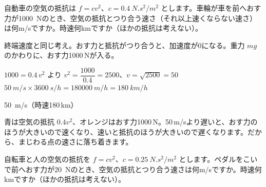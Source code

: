 \begin{reidai}[力のつり合いで決まる最高速度]
自動車の空気の抵抗は $f=cv^2$、$c=\qty{0.4}{N.s^2/m^2}$ とします。車輪が車を前へおす力が\qty{1000}{N}のとき、空気の抵抗とつり合う速さ（それ以上速くならない速さ）は何m/sですか。時速何kmですか（ほかの抵抗は考えない）。\par
\kangaekata 終端速度と同じ考え。おす力と抵抗がつり合うと、加速度が0になる。重力 $mg$ のかわりに、おす力1000\,Nが入る。\par
\shiki $1000=0.4\,v^2$ より $v^2=\dfrac{1000}{0.4}=2500$、$v=\sqrt{2500}=50$\bkvifq
$\qty{50}{m/s}\times\qty{3600}{s/h}=\qty{180000}{m/h}=\qty{180}{km/h}$\par
\kotae \qty{50}{m/s}（時速180\,km）
\end{reidai}
\noindent\begin{minipage}[c]{0.5\linewidth}
\end{minipage}\hfill
\begin{minipage}[c]{0.46\linewidth}\raggedright
青は空気の抵抗 $0.4v^2$、オレンジはおす力1000\,N。50\,m/sより遅いと、おす力のほうが大きいので速くなり、速いと抵抗のほうが大きいので遅くなります。だから、まじわる点の速さに落ち着きます。
\end{minipage}
\par\vspace{4pt}

\begin{jibun}
自転車と人の空気の抵抗を $f=cv^2$、$c=\qty{0.25}{N.s^2/m^2}$ とします。ペダルをこいで前へおす力が\qty{20}{N}のとき、空気の抵抗とつり合う速さは何m/sですか。時速何kmですか（ほかの抵抗は考えない）。
\end{jibun}


